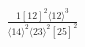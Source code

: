 \documentclass[varwidth, border=5pt]{standalone}
\begin{document}
\begin{my}
$\begin{gathered}
\scriptscriptstyle\frac{1[12]^2⟨12⟩^3}{⟨14⟩^2⟨23⟩^2[25]^2}
\end{gathered}$
\end{my}
\end{document}
